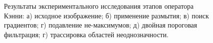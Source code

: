 \begin{figure}[ht!]
\begin{minipage}[h]{0.49\linewidth}
	\end{minipage}
	\hfill
	\begin{minipage}[h]{0.49\linewidth}
	\end{minipage}
\begin{minipage}[h]{0.49\linewidth}
\end{minipage}
\hfill
\begin{minipage}[h]{0.49\linewidth}
\end{minipage}
	\caption{Результаты экспериментального исследования этапов оператора Кэнни: а) исходное изображение; б) применение размытия; в) поиск градиентов; г) подавление не-максимумов; д) двойная пороговая фильтрация; г) трассировка областей неоднозначности.}
	\label{fig:canny}
\end{figure}
